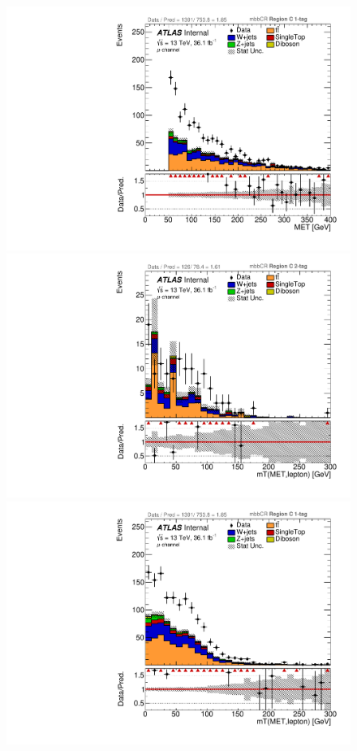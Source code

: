 \begin{figure}[!htbp]
\begin{center}
\includegraphics[scale=0.23]{./figures/boosted/ABCD/muon_mbbcr_RegionC_1tag_MET}\\
\includegraphics[scale=0.23]{./figures/boosted/ABCD/muon_mbbcr_RegionC_WlepMtATLAS}
\includegraphics[scale=0.23]{./figures/boosted/ABCD/muon_mbbcr_RegionC_1tag_WlepMtATLAS}\\

\end{center}
\end{figure}
